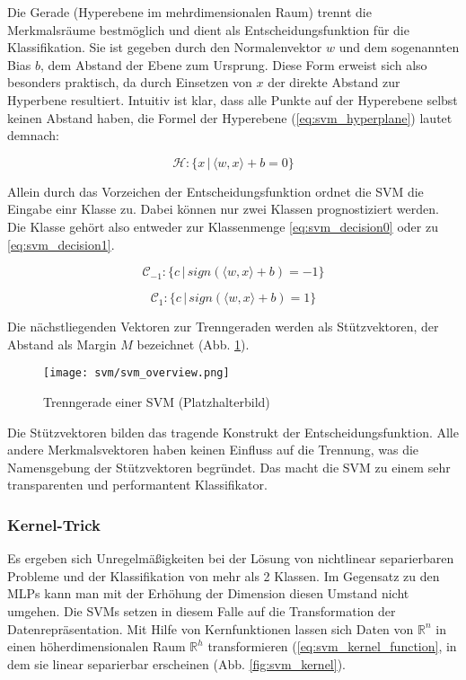 Die Gerade (Hyperebene im mehrdimensionalen Raum) trennt die Merkmalsräume bestmöglich und dient als Entscheidungsfunktion für die Klassifikation. Sie ist gegeben durch den Normalenvektor $w$ und dem sogenannten Bias $b$, dem Abstand der Ebene zum Ursprung. Diese Form erweist sich also besonders praktisch, da durch Einsetzen von $x$ der direkte Abstand zur Hyperbene resultiert.
Intuitiv ist klar, dass alle Punkte auf der Hyperebene selbst keinen Abstand haben, die Formel der Hyperebene (\ref{eq:svm_hyperplane}) lautet demnach: 
 
\begin{equation}
\label{eq:svm_hyperplane}
    \mathcal{H}: \{ x \,|\, \langle w,x \rangle + b = 0 \}
\end{equation}
 
Allein durch das Vorzeichen der Entscheidungsfunktion ordnet die SVM die Eingabe einr Klasse zu. Dabei können nur zwei Klassen  prognostiziert werden. Die Klasse gehört also entweder zur Klassenmenge \ref{eq:svm_decision0} oder zu \ref{eq:svm_decision1}.

\begin{equation}
\label{eq:svm_decision0}
    \mathcal{C}_{-1}: \{ c \,|\, sign(\langle w,x \rangle + b) = -1 \}
\end{equation}

\begin{equation}
\label{eq:svm_decision1}
    \mathcal{C}_1: \{ c \,|\, sign(\langle w,x \rangle + b) = 1 \}
\end{equation}

Die nächstliegenden Vektoren zur Trenngeraden werden als Stützvektoren, der Abstand als Margin $M$ bezeichnet (Abb. \ref{fig:svm_separator}). 

\begin{figure}[htbp] \centering
    \texttt{[image: svm/svm\_overview.png]}
    \caption{Trenngerade einer SVM (Platzhalterbild)}
    \label{fig:svm_separator}
\end{figure}

Die Stützvektoren bilden das tragende Konstrukt der Entscheidungsfunktion. 
Alle andere Merkmalsvektoren haben keinen Einfluss auf die Trennung, was die Namensgebung der Stützvektoren begründet. 
Das macht die SVM zu einem sehr transparenten und performantent Klassifikator. 


\subsubsection{Kernel-Trick}
Es ergeben sich Unregelmäßigkeiten bei der Lösung von nichtlinear separierbaren Probleme und der Klassifikation von mehr als 2 Klassen.
Im Gegensatz zu den MLPs kann man mit der Erhöhung der Dimension diesen Umstand nicht umgehen. 
Die SVMs setzen in diesem Falle auf die Transformation der Datenrepräsentation. 
Mit Hilfe von Kernfunktionen lassen sich Daten von $\mathbb{R}^n$ in einen höherdimensionalen Raum $\mathbb{R}^h$ transformieren (\ref{eq:svm_kernel_function}, in dem sie linear separierbar erscheinen (Abb. \ref{fig:svm_kernel}). 

